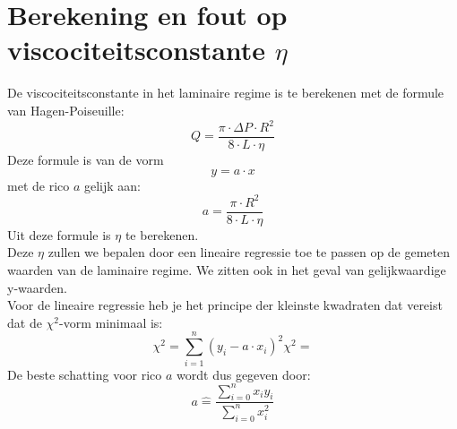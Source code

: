 \section{Berekening en fout op viscociteitsconstante $\eta$}

De viscociteitsconstante in het laminaire regime is te berekenen met de formule van Hagen-Poiseuille:
\begin{equation}
    Q = \frac{\pi \cdot \Delta P \cdot R^2}{8 \cdot L \cdot \eta}
\end{equation}
Deze formule is van de vorm $$y=a\cdot x$$ met de rico $a$ gelijk aan: $$a = \frac{\pi \cdot R^2}{8 \cdot L \cdot \eta}$$
Uit deze formule is $\eta$ te berekenen.\\

Deze $\eta$ zullen we bepalen door een lineaire regressie toe te passen op de gemeten waarden van de laminaire regime.
We zitten ook in het geval van gelijkwaardige y-waarden.\\

Voor de lineaire regressie heb je het principe der kleinste kwadraten dat vereist
dat de $\chi ^2$-vorm minimaal is: 
\begin{equation}
    \chi ^2 = \sum\limits_{i=1}^n(y_i-a\cdot x_i)^2

    \chi ^2 = 
\end{equation}
De beste schatting voor rico $a$ wordt dus gegeven door:
\begin{equation}
    a \hat{=} \frac{\sum\limits_{i=0}^n x_i  y_i}{\sum\limits_{i=0}^n x_i^2}
\end{equation}




